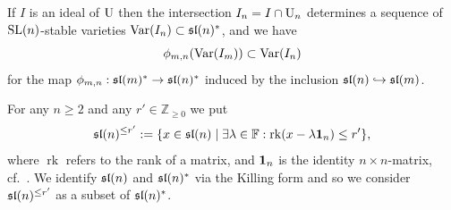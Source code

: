 \documentclass[10pt]{amsart}\oddsidemargin -1mm \evensidemargin -1mm \topmargin -15mm\headheight5mm \headsep 3.5mm \textheight 245mm\textwidth 170mm %
\begin{document}
If $I$ is an ideal of $\operatorname{\mathrm{U}}$ then the intersection $I_n=I\cap \operatorname{\mathrm{U}}_n$ determines a sequence of ${\rm SL}(n)$-stable varieties $\operatorname{\mathrm{Var}}(I_n)\subset\frak{sl}(n)^*$, and we have \begin{equation}\label{Ephimn}\phi_{m, n}(\operatorname{\mathrm{Var}}(I_m))\subset\operatorname{\mathrm{Var}}(I_n)\end{equation}
for the map $\phi_{m, n}:\frak{sl}(m)^*\to\frak{sl}(n)^*$ induced by the inclusion $\frak{sl}(n)\hookrightarrow\frak{sl}(m)$. 

For any $n\ge2$ and any $r'\in\mathbb Z_{\ge0}$ we put $$\frak{sl}(n)^{\le r'}:=\{x\in\frak{sl}(n)\mid \exists\lambda\in\mathbb F : \operatorname{rk}(x-\lambda{\bf 1}_n)\le r'\},$$
where $\operatorname{rk}$ refers to the rank of a matrix, and ${\bf 1}_n$ is the identity $n\times n$-matrix, cf.~\cite{PP1}. We identify $\frak{sl}(n)$ and $\frak{sl}(n)^*$ via the Killing form and so we consider $\frak{sl}(n)^{\le r'}$ as a subset of $\frak{sl}(n)^*$. 
\end{document}

